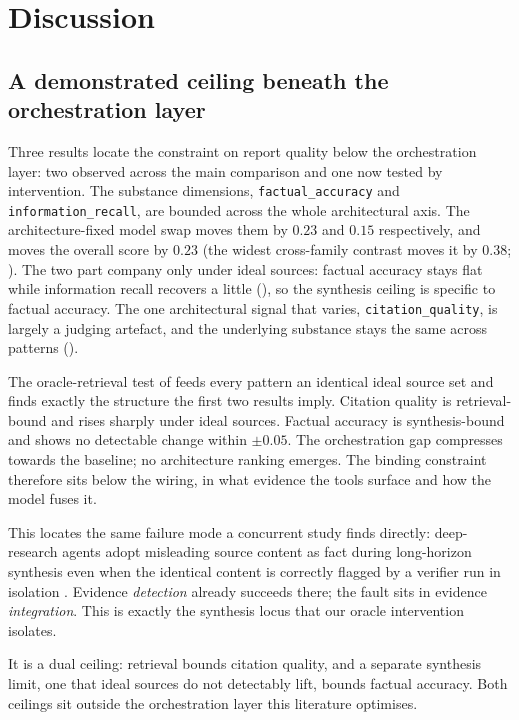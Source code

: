 \documentclass[11pt]{article}
\newcommand{\dimrow}[1]{\texttt{#1}}
\begin{document}
\section{Discussion}\label{sec:discussion}

\subsection{A demonstrated ceiling beneath the orchestration layer}\label{sec:ceiling}
Three results locate the constraint on report quality below the orchestration layer: two
observed across the main comparison and one now tested by intervention. The substance
dimensions, \dimrow{factual\_accuracy} and \dimrow{information\_recall}, are bounded across
the whole architectural axis. The architecture-fixed model swap moves them by
$0.23$ and $0.15$ respectively, and moves the overall score by $0.23$ (the widest
cross-family contrast moves it by $0.38$; ). The two part
company only under ideal sources: factual accuracy stays flat while information recall
recovers a little (), so the synthesis ceiling is specific to factual
accuracy. The one architectural signal that varies, \dimrow{citation\_quality}, is largely
a judging artefact, and the underlying substance stays the same across patterns
().

The oracle-retrieval test of  feeds every pattern an identical ideal
source set and finds exactly the structure the first two results imply. Citation quality
is retrieval-bound and rises sharply under ideal sources. Factual accuracy is
synthesis-bound and shows no detectable change within $\pm0.05$. The orchestration gap
compresses towards the baseline; no architecture ranking emerges. The
binding constraint therefore sits below the wiring, in what evidence the tools surface
and how the model fuses it.

This locates the same failure mode a concurrent study finds directly: deep-research
agents adopt misleading source content as fact during long-horizon synthesis even when
the identical content is correctly flagged by a verifier run in isolation
\citep{zhu2026misknow}. Evidence \emph{detection} already succeeds there; the fault sits in
evidence \emph{integration}. This is exactly the synthesis locus that our oracle
intervention isolates.

It is a dual ceiling: retrieval bounds citation quality, and a separate synthesis limit,
one that ideal sources do not detectably lift, bounds factual accuracy. Both ceilings
sit outside the orchestration layer this literature optimises.
\end{document}
